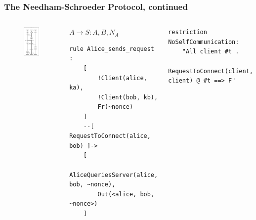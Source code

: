 \documentclass[aspectratio=169,t,xcolor=table]{beamer}
\begin{document}
\begin{frame}[fragile]
    \frametitle{The Needham-Schroeder Protocol, continued}
    \begin{columns}
        \begin{figure}
            \centering
            \includegraphics[width=.8\textwidth]{images/NS.png}
        \end{figure}
        \begin{block}{$A \to S: A,B,N_A$}
            \begin{lstlisting}[language=Tamarin]
rule Alice_sends_request :
    [
        !Client(alice, ka),
        !Client(bob, kb),
        Fr(~nonce)
    ]
    --[ RequestToConnect(alice, bob) ]->
    [
        AliceQueriesServer(alice, bob, ~nonce),
        Out(<alice, bob, ~nonce>)
    ]\end{lstlisting}
        \end{block}
        \begin{block}{}
        \begin{lstlisting}[language=Tamarin]
restriction NoSelfCommunication:
    "All client #t .
        RequestToConnect(client, client) @ #t ==> F"\end{lstlisting}
        \end{block}
    \end{columns}
\end{frame}
\end{document}
